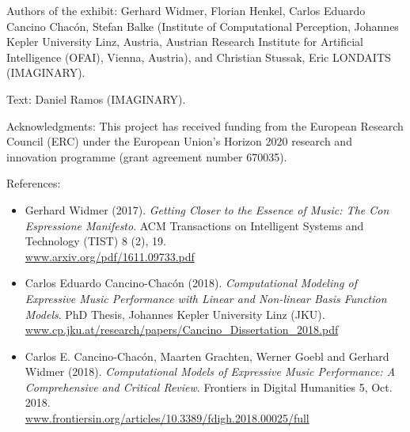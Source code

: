 \begin{sectcredits}

\item[Authors of the exhibit:] Gerhard Widmer, Florian Henkel, Carlos Eduardo Cancino Chacón, Stefan Balke (Institute of Computational Perception, Johannes Kepler University Linz, Austria, Austrian Research Institute for Artificial Intelligence (OFAI), Vienna, Austria), and Christian Stussak, Eric LONDAITS (IMAGINARY).

\item[Text:] Daniel Ramos (IMAGINARY).

\item[Acknowledgments:] This project has received funding from the European Research Council (ERC) under the European Union's Horizon 2020 research and innovation programme (grant agreement number 670035).

\item[References:] \strut
\noindent \begin{itemize}[leftmargin=*]
\item Gerhard Widmer (2017). \emph{Getting Closer to the Essence of Music: The Con Espressione Manifesto}. ACM Transactions on Intelligent Systems and Technology (TIST) 8 (2), 19. \\
\url{www.arxiv.org/pdf/1611.09733.pdf}

\item Carlos Eduardo Cancino-Chacón (2018). \emph{Computational Modeling of Expressive Music Performance with Linear and Non-linear Basis Function Models}. PhD Thesis, Johannes Kepler University Linz (JKU).\\
\url{www.cp.jku.at/research/papers/Cancino_Dissertation_2018.pdf}

\item Carlos E. Cancino-Chacón, Maarten Grachten, Werner Goebl and Gerhard Widmer (2018). \emph{Computational Models of Expressive Music Performance: A Comprehensive and Critical Review}. Frontiers in Digital Humanities 5, Oct. 2018. \\
\url{www.frontiersin.org/articles/10.3389/fdigh.2018.00025/full}
\end{itemize}
\end{sectcredits}
